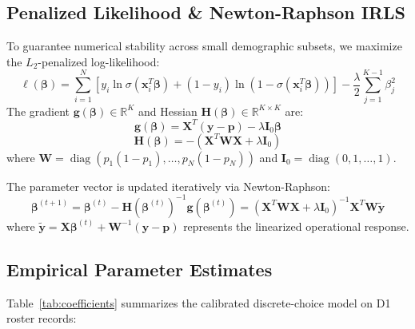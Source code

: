 \documentclass[11pt,a4paper]{article}
\begin{document}
\subsection{Penalized Likelihood \& Newton-Raphson IRLS}
To guarantee numerical stability across small demographic subsets, we maximize the $L_2$-penalized log-likelihood:
\begin{equation}
\ell(\mathbf{\beta}) = \sum_{i=1}^N \left[ y_i \ln \sigma(\mathbf{x}_i^T \mathbf{\beta}) + (1 - y_i) \ln(1 - \sigma(\mathbf{x}_i^T \mathbf{\beta})) \right] - \frac{\lambda}{2} \sum_{j=1}^{K-1} \beta_j^2
\end{equation}
The gradient $\mathbf{g}(\mathbf{\beta}) \in \mathbb{R}^K$ and Hessian $\mathbf{H}(\mathbf{\beta}) \in \mathbb{R}^{K \times K}$ are:
\begin{equation}
\mathbf{g}(\mathbf{\beta}) = \mathbf{X}^T (\mathbf{y} - \mathbf{p}) - \lambda \mathbf{I}_0 \mathbf{\beta}
\end{equation}
\begin{equation}
\mathbf{H}(\mathbf{\beta}) = -\left( \mathbf{X}^T \mathbf{W} \mathbf{X} + \lambda \mathbf{I}_0 \right)
\end{equation}
where $\mathbf{W} = \operatorname{diag}(p_1(1-p_1), \dots, p_N(1-p_N))$ and $\mathbf{I}_0 = \operatorname{diag}(0, 1, \dots, 1)$.

The parameter vector is updated iteratively via Newton-Raphson:
\begin{equation}
\mathbf{\beta}^{(t+1)} = \mathbf{\beta}^{(t)} - \mathbf{H}(\mathbf{\beta}^{(t)})^{-1} \mathbf{g}(\mathbf{\beta}^{(t)}) = \left( \mathbf{X}^T \mathbf{W} \mathbf{X} + \lambda \mathbf{I}_0 \right)^{-1} \mathbf{X}^T \mathbf{W} \tilde{\mathbf{y}}
\end{equation}
where $\tilde{\mathbf{y}} = \mathbf{X} \mathbf{\beta}^{(t)} + \mathbf{W}^{-1}(\mathbf{y} - \mathbf{p})$ represents the linearized operational response.

\subsection{Empirical Parameter Estimates}
Table~\ref{tab:coefficients} summarizes the calibrated discrete-choice model on D1 roster records:
\end{document}
